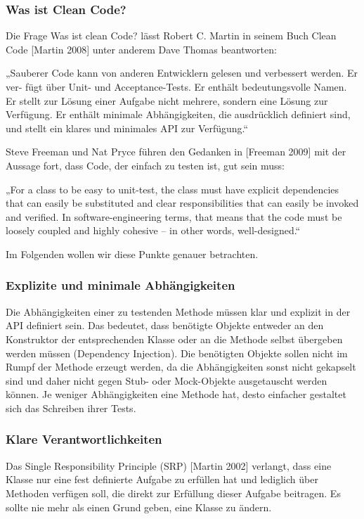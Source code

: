 \subsubsection{Was ist Clean Code?}
Die Frage Was ist clean Code? lässt Robert C. Martin in seinem Buch Clean Code
[Martin 2008] unter anderem Dave Thomas beantworten:

„Sauberer Code kann von anderen Entwicklern gelesen und verbessert werden. Er ver-
fügt über Unit- und Acceptance-Tests. Er enthält bedeutungsvolle Namen. Er stellt zur
Lösung einer Aufgabe nicht mehrere, sondern eine Lösung zur Verfügung. Er enthält
minimale Abhängigkeiten, die ausdrücklich definiert sind, und stellt ein klares und
minimales API zur Verfügung.“

Steve Freeman und Nat Pryce führen den Gedanken in [Freeman 2009] mit der Aussage
fort, dass Code, der einfach zu testen ist, gut sein muss:

„For a class to be easy to unit-test, the class must have explicit dependencies that can
easily be substituted and clear responsibilities that can easily be invoked and verified.
In software-engineering terms, that means that the code must be loosely coupled and
highly cohesive – in other words, well-designed.“

Im Folgenden wollen wir diese Punkte genauer betrachten.

\subsubsection{Explizite und minimale Abhängigkeiten}
Die Abhängigkeiten einer zu testenden Methode müssen klar und explizit in der API definiert sein. Das bedeutet, dass benötigte Objekte entweder an den Konstruktor der entsprechenden Klasse oder an die Methode selbst übergeben werden müssen (Dependency Injection). Die benötigten Objekte sollen nicht im Rumpf der Methode erzeugt werden, da die Abhängigkeiten sonst nicht gekapselt sind und daher nicht gegen Stub- oder Mock-Objekte ausgetauscht werden können. Je weniger Abhängigkeiten eine Methode hat, desto einfacher gestaltet sich das Schreiben ihrer Tests.

\subsubsection{Klare Verantwortlichkeiten}
Das Single Responsibility Principle (SRP) [Martin 2002] verlangt, dass eine Klasse nur eine
fest definierte Aufgabe zu erfüllen hat und lediglich über Methoden verfügen soll, die direkt
zur Erfüllung dieser Aufgabe beitragen. Es sollte nie mehr als einen Grund geben, eine Klasse zu ändern.

